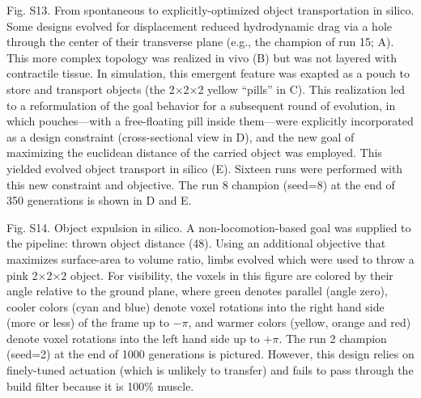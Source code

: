 Fig. S13.  From spontaneous to explicitly-optimized object transportation in silico. Some designs evolved for displacement reduced hydrodynamic drag via a hole through the center of their transverse plane (e.g., the champion of run 15; A). This more complex topology was realized in vivo (B) but was not layered with contractile tissue. In simulation, this emergent feature was exapted as a pouch to store and transport objects (the 2{$\times$}2{$\times$}2 yellow ``pills'' in C). This realization led to a reformulation of the goal behavior for a subsequent round of evolution, in which pouches---with a free-floating pill inside them---were explicitly incorporated as a design constraint (cross-sectional view in D), and the new goal of maximizing the euclidean distance of the carried object was employed. This yielded evolved object transport in silico (E). Sixteen runs were performed with this new constraint and objective. The run 8 champion (seed=8) at the end of 350 generations is shown in D and E. 




Fig. S14.  Object expulsion in silico. A non-locomotion-based goal was supplied to the pipeline: thrown object distance (48). Using an additional objective that maximizes surface-area to volume ratio, limbs evolved which were used to throw a pink 2{$\times$}2{$\times$}2 object. For visibility, the voxels in this figure are colored by their angle relative to the ground plane, where green denotes parallel (angle zero), cooler colors (cyan and blue) denote voxel rotations into the right hand side (more or less) of the frame up to {$-\pi$}, and warmer colors (yellow, orange and red) denote voxel rotations into the left hand side up to {$+\pi$}. The run 2 champion (seed=2) at the end of 1000 generations is pictured. However, this design relies on finely-tuned actuation (which is unlikely to transfer) and fails to pass through the build filter because it is 100\% muscle. 



